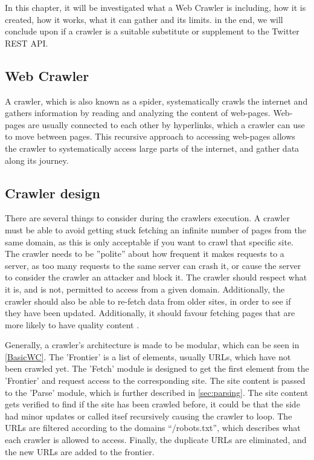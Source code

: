 In this chapter, it will be investigated what a Web Crawler is including, how it
is created, how it works, what it can gather and its limits. in the end, we will
conclude upon if a crawler is a suitable substitute or supplement to
the Twitter \ac{REST} \ac{API}.

\subsection{Web Crawler}\label{subsec:crawler}
A crawler, which is also known as a spider, systematically crawls the internet
and gathers information by reading and analyzing the content of web-pages.
Web-pages are usually connected to each other by hyperlinks, which a
crawler can use to move between pages. This recursive approach to accessing
web-pages allows the crawler to systematically access large parts of the
internet, and gather data along its journey. \Source %

\subsection{Crawler design}%
There are several things to consider during the crawlers execution. A crawler
must be able to avoid getting stuck fetching an infinite number of pages from
the same domain, as this is only acceptable if you want to crawl that specific
site.
The crawler needs to be ''polite'' about how frequent it makes requests to a
server, as too many requests to the same server can crash it, or cause the
server to consider the crawler an attacker and block it.
The crawler should respect what it is, and is not, permitted to access from a
given domain. Additionally, the crawler should also be able to re-fetch data
from older sites, in order to see if they have been updated. Additionally, it
should favour fetching pages that are more likely to have quality content \citep[Ch.
20.1]{manning2008introduction}.\nl

Generally, a crawler's architecture is made to be modular, which can be seen in
\autoref{BasicWC}. The 'Frontier' is a list of elements, usually URLs, which
have not been crawled yet. The 'Fetch' module is designed to get the first
element from the 'Frontier' and request access to the corresponding site. The
site content is passed to the 'Parse' module, which is further described in
\autoref{sec:parsing}. The site content gets verified to find if the site has
been crawled before, it could be that the side had minor updates or called
itsef recursively causing the crawler to loop.
The URLs are filtered according to the domains ``/robots.txt'', which describes
what each crawler is allowed to access. Finally, the duplicate URLs are
eliminated, and the new URLs are added to the frontier.\nl%


